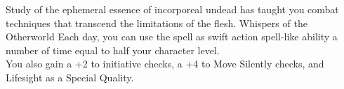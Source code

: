 \shortdescfeat
{Study of the ephemeral essence of incorporeal undead has taught you combat techniques that transcend the limitations of the flesh.}
{Whispers of the Otherworld}
{Each day, you can use the spell  as swift action spell-like ability a number of time equal to half your character level.\\
You also gain a +2 to initiative checks, a +4 to Move Silently checks, and Lifesight as a Special Quality.}

